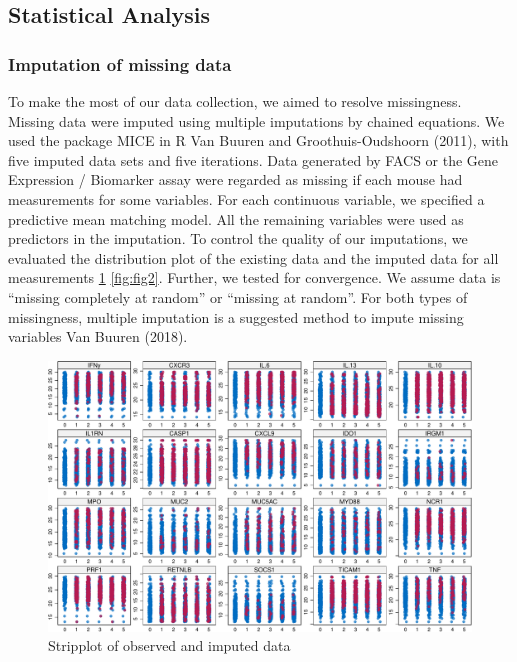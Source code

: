 \documentclass[
]{article}
\begin{document}
\hypertarget{statistical-analysis}{%
\subsection{Statistical Analysis}\label{statistical-analysis}}

\hypertarget{imputation-of-missing-data}{%
\subsubsection{Imputation of missing
data}\label{imputation-of-missing-data}}

To make the most of our data collection, we aimed to resolve
missingness. Missing data were imputed using multiple imputations by
chained equations. We used the package MICE in R Van Buuren and
Groothuis-Oudshoorn (2011), with five imputed data sets and five
iterations. Data generated by FACS or the Gene Expression / Biomarker
assay were regarded as missing if each mouse had measurements for some
variables. For each continuous variable, we specified a predictive mean
matching model. All the remaining variables were used as predictors in
the imputation. To control the quality of our imputations, we evaluated
the distribution plot of the existing data and the imputed data for all
measurements \ref{fig:fig1} \ref{fig:fig2}. Further, we tested for
convergence. We assume data is ``missing completely at random'' or
``missing at random''. For both types of missingness, multiple
imputation is a suggested method to impute missing variables Van Buuren
(2018).

\begin{figure}[th]
\includegraphics[width=1\linewidth]{TAC_report_2022_files/figure-latex/fig1-1} \caption{Stripplot of observed and imputed data}\label{fig:fig1}
\end{figure}
\end{document}
